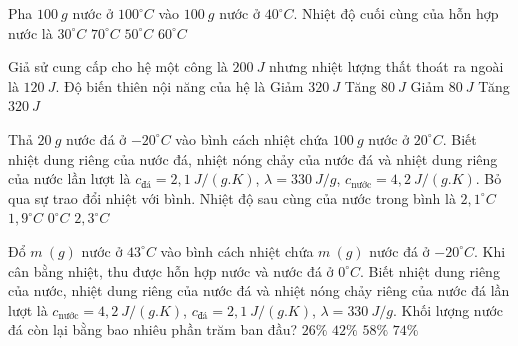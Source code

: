 \begin{ex} %
	Pha $100\ g$ nước ở $100^\circ C$ vào $100\ g$ nước ở $40^\circ C$. Nhiệt độ cuối cùng của hỗn hợp nước là
	\choice
	{$30^\circ C$}
	{\True $70^\circ C$}
	{$50^\circ C$}
	{$60^\circ C$}
	\loigiai{}
\end{ex}

\begin{ex} %
	Giả sử cung cấp cho hệ một công là $200\ J$ nhưng nhiệt lượng thất thoát ra ngoài là $120\ J$. Độ biến thiên nội năng của hệ là
	\choice
	{Giảm $320\ J$}
	{\True Tăng $80\ J$}
	{Giảm $80\ J$}
	{Tăng $320\ J$}
	\loigiai{}
\end{ex}

\begin{ex} %
	Thả $20\ g$ nước đá ở $-20^\circ C$ vào bình cách nhiệt chứa $100\ g$ nước ở $20^\circ C$. Biết nhiệt dung riêng của nước đá, nhiệt nóng chảy của nước đá và nhiệt dung riêng của nước lần lượt là $c_{\text{đá}} = 2,1\ J/(g.K)$, $\lambda = 330\ J/g$, $c_{\text{nước}} = 4,2\ J/(g.K)$. Bỏ qua sự trao đổi nhiệt với bình. Nhiệt độ sau cùng của nước trong bình là
	\choice
	{$2,1^\circ C$}
	{\True $1,9^\circ C$}
	{$0^\circ C$}
	{$2,3^\circ C$}
\end{ex}

\begin{ex} %
	Đổ $m\ (g)$ nước ở $43^\circ C$ vào bình cách nhiệt chứa $m\ (g)$ nước đá ở $-20^\circ C$. Khi cân bằng nhiệt, thu được hỗn hợp nước và nước đá ở $0^\circ C$. Biết nhiệt dung riêng của nước, nhiệt dung riêng của nước đá và nhiệt nóng chảy riêng của nước đá lần lượt là $c_{\text{nước}} = 4,2\ J/(g.K)$, $c_{\text{đá}} = 2,1\ J/(g.K)$, $\lambda = 330\ J/g$. Khối lượng nước đá còn lại bằng bao nhiêu phần trăm ban đầu?
	\choice
	{$26\%$}
	{$42\%$}
	{\True $58\%$}
	{$74\%$}
\end{ex}
